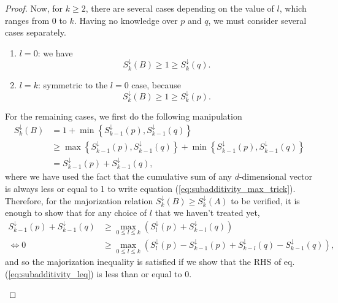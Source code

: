 \begin{proof}
    Now, for $k \geq 2$, there are several cases depending on the value of $l$, which ranges from $0$ to $k$. Having no knowledge over $p$ and $q$, we must consider several cases separately.
    \begin{enumerate}
        \item \underline{$l = 0$}: we have \label{case:0}
        \begin{equation}
            S^\downarrow_k(B) \geq 1 \geq S^\downarrow_k(q).
        \end{equation}
        \item \underline{$l = k$}: symmetric to the $l = 0$ case, because \label{case:k}
        \begin{equation}
            S^\downarrow_k(B) \geq 1 \geq S^\downarrow_k(p).
        \end{equation}
    \end{enumerate}
    For the remaining cases, we first do the following manipulation
    \begin{align}
        S^\downarrow_k(B) &= 1 + \min \left\{S^\downarrow_{k-1}(p), S^\downarrow_{k-1}(q)\right\}\\
                          &\geq \max \left\{S^\downarrow_{k-1}(p), S^\downarrow_{k-1}(q)\right\} + \min \left\{S^\downarrow_{k-1}(p), S^\downarrow_{k-1}(q)\right\} \label{eq:subadditivity_max_trick}\\
                          &= S^\downarrow_{k-1}(p) + S^\downarrow_{k-1}(q),
    \end{align}
    where we have used the fact that the cumulative sum of any $d$-dimensional vector is always less or equal to 1 to write equation (\ref{eq:subadditivity_max_trick}). Therefore, for the majorization relation $S^\downarrow_k(B) \geq S^\downarrow_k(A)$ to be verified, it is enough to show that for any choice of $l$ that we haven't treated yet,
    \begin{align}
                          S^\downarrow_{k-1}(p) + S^\downarrow_{k-1}(q) &\geq \max_{0\leq l \leq k} \left(S^\downarrow_l (p) + S^\downarrow_{k-l} (q)\right)\\
                                                                        \iff 0 &\geq \max_{0\leq l \leq k} \left(S^\downarrow_l (p) - S^\downarrow_{k-1}(p) + S^\downarrow_{k-l} (q) - S^\downarrow_{k-1}(q)\right), \label{eq:subadditivity_leq}
    \end{align}
    and so the majorization inequality is satisfied if we show that the RHS of eq. (\ref{eq:subadditivity_leq}) is less than or equal to 0.
    \begin{enumerate}[resume]

\end{enumerate}
\end{proof}
